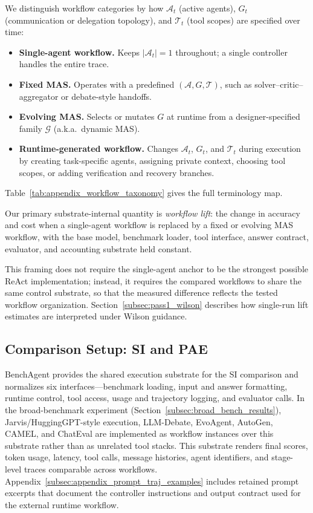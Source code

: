 We distinguish workflow categories by how \(\mathcal{A}_t\) (active agents), \(G_t\) (communication or delegation topology), and \(\mathcal{T}_t\) (tool scopes) are specified over time:
\begin{itemize}[leftmargin=12pt, nosep]
    \item \textbf{Single-agent workflow.} Keeps \(|\mathcal{A}_t|=1\) throughout; a single controller handles the entire trace.
    \item \textbf{Fixed MAS.} Operates with a predefined \((\mathcal{A},G,\mathcal{T})\), such as solver--critic--aggregator or debate-style handoffs.
    \item \textbf{Evolving MAS.} Selects or mutates \(G\) at runtime from a designer-specified family \(\mathcal{G}\) (a.k.a.\ dynamic MAS). 
    \item \textbf{Runtime-generated workflow.} Changes \(\mathcal{A}_t\), \(G_t\), and \(\mathcal{T}_t\) during execution by creating task-specific agents, assigning private context, choosing tool scopes, or adding verification and recovery branches.
\end{itemize}
Table~\ref{tab:appendix_workflow_taxonomy} gives the full terminology map.

\begin{definition}
    \label{def:workflow_lift}
    Our primary substrate-internal quantity is \emph{workflow lift}: the change in accuracy and cost when a single-agent workflow is replaced by a fixed or evolving MAS workflow, with the base model, benchmark loader, tool interface, answer contract, evaluator, and accounting substrate held constant.
\end{definition}

This framing does not require the single-agent anchor to be the strongest possible ReAct implementation; instead, it requires the compared workflows to share the same control substrate, so that the measured difference reflects the tested workflow organization. Section~\ref{subsec:pass1_wilson} describes how single-run lift estimates are interpreted under Wilson guidance.


\subsection{Comparison Setup: SI and PAE}
\label{subsec:comparison_setup}
BenchAgent provides the shared execution substrate for the SI comparison and normalizes six interfaces---benchmark loading, input and answer formatting, runtime control, tool access, usage and trajectory logging, and evaluator calls.
In the broad-benchmark experiment (Section~\ref{subsec:broad_bench_results}), Jarvis/HuggingGPT-style execution, LLM-Debate, EvoAgent, AutoGen, CAMEL, and ChatEval are implemented as workflow instances over this substrate rather than as unrelated tool stacks.
This substrate renders final scores, token usage, latency, tool calls, message histories, agent identifiers, and stage-level traces comparable across workflows.
Appendix~\ref{subsec:appendix_prompt_traj_examples} includes retained prompt excerpts that document the controller instructions and output contract used for the external runtime workflow.

